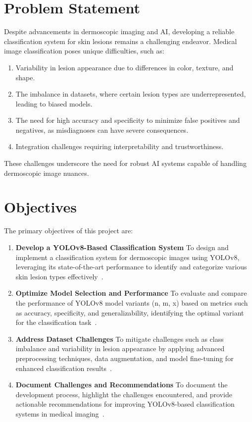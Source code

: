 \documentclass[a4paper,12pt]{report}
\begin{document}
\begin{spacing}{1.5}
    \newpage

    \section{Problem Statement}
    Despite advancements in dermoscopic imaging and AI, developing a reliable classification system for skin lesions remains a challenging endeavor. Medical image classification poses unique difficulties, such as:
    \begin{enumerate}
        \item Variability in lesion appearance due to differences in color, texture, and shape.
        \item The imbalance in datasets, where certain lesion types are underrepresented, leading to biased models.
        \item The need for high accuracy and specificity to minimize false positives and negatives, as misdiagnoses can have severe consequences.
        \item Integration challenges requiring interpretability and trustworthiness.
    \end{enumerate}
    These challenges underscore the need for robust AI systems capable of handling dermoscopic image nuances\cite{intro5}\cite{intro6}.

    \section{Objectives}
    The primary objectives of this project are:
    \begin{enumerate}
        \item \textbf{Develop a YOLOv8-Based Classification System} To design and implement a classification system for dermoscopic images using YOLOv8, leveraging its state-of-the-art performance to identify and categorize various skin lesion types effectively~\cite{ultralytics23}.
        \item \textbf{Optimize Model Selection and Performance} To evaluate and compare the performance of YOLOv8 model variants (n, m, x) based on metrics such as accuracy, specificity, and generalizability, identifying the optimal variant for the classification task~\cite{intro9}.
        \item \textbf{Address Dataset Challenges} To mitigate challenges such as class imbalance and variability in lesion appearance by applying advanced preprocessing techniques, data augmentation, and model fine-tuning for enhanced classification results~\cite{dl7}.
        \item \textbf{Document Challenges and Recommendations} To document the development process, highlight the challenges encountered, and provide actionable recommendations for improving YOLOv8-based classification systems in medical imaging~\cite{intro5}.
    \end{enumerate}


\end{spacing}
\end{document}
